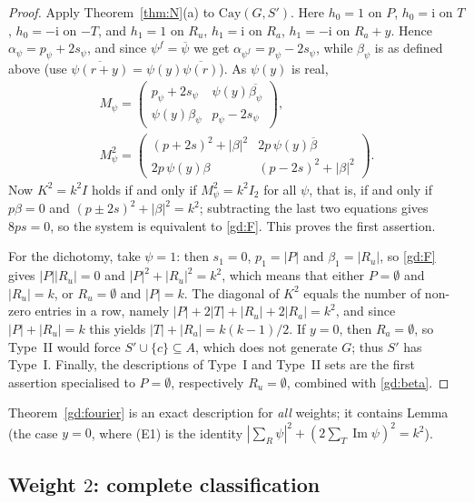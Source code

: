 \documentclass[preprint,11pt]{elsarticle}
\makeatletter
\theoremstyle{definition}
\theoremstyle{remark}
\newcommand{\ii}{\mathrm i}
\newcommand{\SR}[1]{\@nameuse{SR@#1}}
\makeatother
\begin{document}
\begin{proof}
Apply Theorem~\ref{thm:N}(a) to $\mathrm{Cay}(G,S')$. Here $h_0=1$ on $P$, $h_0=\ii$ on $T$, $h_0=-\ii$ on $-T$, and $h_1=1$ on $R_u$, $h_1=\ii$ on $R_a$, $h_1=-\ii$ on $R_a+y$. Hence $\alpha_\psi=p_\psi+2s_\psi$, and since $\psi^f=\overline\psi$ we get $\alpha_{\psi^f}=p_\psi-2s_\psi$, while $\beta_\psi$ is as defined above (use $\overline{\psi(r+y)}=\psi(y)\overline{\psi(r)}$). As $\psi(y)$ is real,
\begin{gather*}
M_\psi=\begin{pmatrix}p_\psi+2s_\psi&\psi(y)\overline{\beta_\psi}\\ \psi(y)\beta_\psi&p_\psi-2s_\psi\end{pmatrix},\\
M_\psi^2=\begin{pmatrix}(p+2s)^2+|\beta|^2&2p\,\psi(y)\overline{\beta}\\ 2p\,\psi(y)\beta&(p-2s)^2+|\beta|^2\end{pmatrix}.
\end{gather*}
Now $K^2=k^2I$ holds if and only if $M_\psi^2=k^2I_2$ for all $\psi$, that is, if and only if $p\beta=0$ and $(p\pm2s)^2+|\beta|^2=k^2$; subtracting the last two equations gives $8ps=0$, so the system is equivalent to \eqref{gd:F}. This proves the first assertion.

For the dichotomy, take $\psi=1$: then $s_1=0$, $p_1=|P|$ and $\beta_1=|R_u|$, so \eqref{gd:F} gives $|P||R_u|=0$ and $|P|^2+|R_u|^2=k^2$, which means that either $P=\emptyset$ and $|R_u|=k$, or $R_u=\emptyset$ and $|P|=k$. The diagonal of $K^2$ equals the number of non-zero entries in a row, namely $|P|+2|T|+|R_u|+2|R_a|=k^2$, and since $|P|+|R_u|=k$ this yields $|T|+|R_a|=k(k-1)/2$. If $y=0$, then $R_a=\emptyset$, so Type~II would force $S'\cup\{c\}\subseteq A$, which does not generate $G$; thus $S'$ has Type~I. Finally, the descriptions of Type~I and Type~II sets are the first assertion specialised to $P=\emptyset$, respectively $R_u=\emptyset$, combined with \eqref{gd:beta}.
\end{proof}

Theorem~\ref{gd:fourier} is an exact description for \emph{all} weights; it contains Lemma~\SR{lem:kgen} (the case $y=0$, where (E1) is the identity $|\sum_R\psi|^2+(2\sum_T\operatorname{Im}\psi)^2=k^2$).

\subsection{Weight $2$: complete classification}
\end{document}
